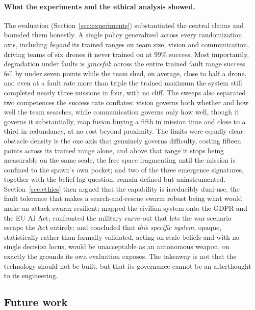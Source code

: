 \paragraph{What the experiments and the ethical analysis showed.}
The evaluation (Section~\ref{sec:experiments}) substantiated the central claims
and bounded them honestly. A single policy generalized across every randomization
axis, including \emph{beyond} its trained ranges on team size, vision and
communication, driving teams of six drones it never trained on at $99\%$
success. Most importantly, degradation under faults is \emph{graceful}: across
the entire trained fault range success fell by under seven points while the team
shed, on average, close to half a drone, and even at a fault rate more than
triple the trained maximum the system still completed nearly three missions in
four, with no cliff. The sweeps also separated two competences the success rate
conflates: vision governs both whether and how well the team searches, while
communication governs only how well, though it governs it substantially, map
fusion buying a fifth in mission time and close to a third in redundancy,
at no cost beyond proximity. The limits were equally clear: obstacle density is
the one axis that genuinely governs difficulty, costing fifteen points across
its trained range alone, and above that range it stops being measurable on the
same scale, the free space fragmenting until the mission is confined to the
spawn's own pocket; and two of the
three emergence signatures, together with the belief-lag question, remain
defined but uninstrumented.
Section~\ref{sec:ethics} then argued that the capability is irreducibly
dual-use, the fault tolerance that makes a search-and-rescue swarm robust being
what would make an attack swarm resilient; mapped the civilian system onto the
GDPR and the EU AI Act; confronted the military carve-out that lets the war
scenario escape the Act entirely; and concluded that \emph{this specific system},
opaque, statistically rather than formally validated, acting on stale beliefs and
with no single decision locus, would be unacceptable as an autonomous weapon, on
exactly the grounds its own evaluation exposes. The takeaway is not that the
technology should not be built, but that its governance cannot be an afterthought
to its engineering.

\subsection{Future work}
\label{subsec:conc-future}

